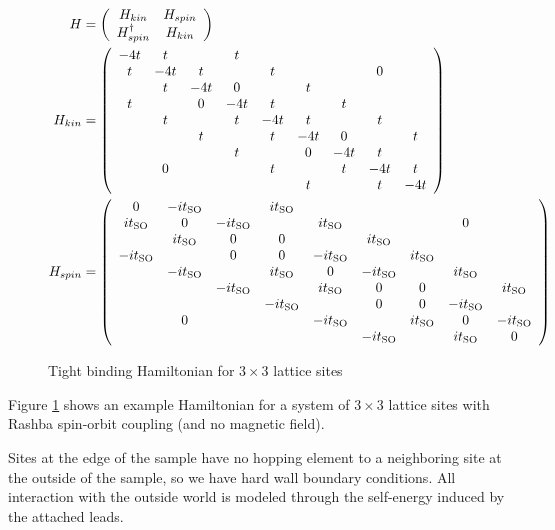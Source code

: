 \documentclass[11pt]{report}
\newcommand{\inp}[1]{\ensuremath{\left(#1\right)}}
\newcommand{\tso}{\ensuremath{t_{\textnormal{SO}}}}
\begin{document}
\begin{figure}[tb]
    \begin{align*}
        H &= \inp{
           \begin{array}{cc}
                H_{kin}  & H_{spin} \\
                H_{spin}^\dagger & H_{kin} \\
           \end{array}} \\
        H_{kin} &= \inp{
            \begin{array}{ccccccccc}
                -4t & t &  & t\\
                t & -4t & t &  & t &  &  & 0\\
                & t & -4t & 0 &  & t\\
                t &  & 0 & -4t & t &  & t\\
                & t &  & t & -4t & t &  & t\\
                &  & t &  & t & -4t & 0 &  & t\\
                &  &  & t &  & 0 & -4t & t\\
                & 0 &  &  & t &  & t & -4t & t\\
                &  &  &  &  & t &  & t & -4t\end{array}
        } \\
        H_{spin} &= \inp{
            \begin{array}{ccccccccc}
                0 & -i\tso &  & i\tso\\
                i\tso & 0 & -i\tso &  & i\tso &  &  & 0\\
                & i\tso & 0 & 0 &  & i\tso\\
                -i\tso &  & 0 & 0 & -i\tso &  & i\tso\\
                & -i\tso &  & i\tso & 0 & -i\tso &  & i\tso\\
                &  & -i\tso &  & i\tso & 0 & 0 &  & i\tso\\
                &  &  & -i\tso &  & 0 & 0 & -i\tso\\
                & 0 &  &  & -i\tso &  & i\tso & 0 & -i\tso\\
                &  &  &  &  & -i\tso &  & i\tso & 0
            \end{array}
        }
    \end{align*}
    \caption{Tight binding Hamiltonian for $ 3 \times 3 $ lattice sites}
    \label{fig:hamiltonian}
\end{figure}

Figure \ref{fig:hamiltonian} shows an example Hamiltonian for a system of
$3 \times 3$ lattice sites with Rashba spin-orbit coupling (and no magnetic
field).

Sites at the edge of the sample have no hopping element to a neighboring site
at the outside of the sample, so we have hard wall boundary conditions. All
interaction with the outside world is modeled through the self-energy induced
by the attached leads.






\end{document}

